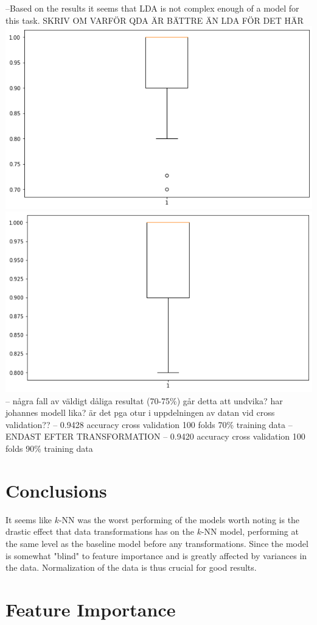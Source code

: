 \documentclass{article}
\begin{document}
--Based on the results it seems that LDA is not complex enough of a model for this task. SKRIV OM VARFÖR QDA ÄR BÄTTRE ÄN LDA FÖR DET HÄR
\includegraphics[scale=0.3]{boxplotQDA.png}
\includegraphics[scale=0.3]{boxplotQDA90.png}
-- några fall av väldigt dåliga resultat (70-75\%) går detta att undvika? har johannes modell lika? är det pga otur i uppdelningen av datan vid cross validation??
-- 0.9428 accuracy cross validation 100 folds 70\% training data
-- ENDAST EFTER TRANSFORMATION
-- 0.9420 accuracy cross validation 100 folds 90\% training data

\section{Conclusions}
It seems like $k$-NN was the worst performing of the models worth noting is the drastic effect that data transformations has on the $k$-NN model, performing at the same level as the baseline model before any transformations. Since the model is somewhat "blind" to feature importance and is greatly affected by variances in the data. Normalization of the data is thus crucial for good results.



\section{Feature Importance}
\end{document}
